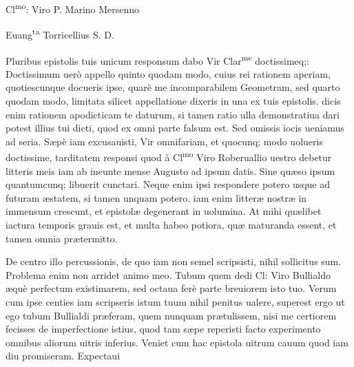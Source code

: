 \documentclass[11pt,a4paper]{article}
\begin{document}

Cl\textsuperscript{mo}: Viro P. Marino Mersenno

Euang\textsuperscript{ta} Torricellius S. D.

Pluribus epistolis tuis unicum responsum dabo Vir Clar\textsuperscript{me} doctissimeq;: Doctissimum uerò appello quinto quodam modo, cuius rei rationem aperiam, quotiescunque docueris ipse, quarè me incomparabilem Geometram, sed quarto quodam modo, limitata silicet appellatione dixeris in una ex tuis epistolis. dicis enim rationem apodicticam te daturum, si tamen ratio ulla demonstratiua dari potest illius tui dicti, quod ex omni parte falsum est. Sed omissis iocis ueniamus ad seria. Sæpè iam excusauisti, Vir omnifariam, et quocunq; modo uolueris doctissime, tarditatem responsi quod à Cl\textsuperscript{mo} Viro Roberuallio uestro debetur litteris meis iam ab ineunte mense Augusto ad ipsum datis. Sine quæso ipsum quantumcunq; libuerit cunctari. Neque enim ipsi respondere potero usque ad futuram æstatem, si tamen unquam potero. iam enim litteræ nostræ in immensum crescunt, et epistolæ degenerant in uolumina. At mihi quælibet iactura temporis grauis est, et multa habeo potiora, quæ maturanda essent, et tamen omnia prætermitto.

De centro illo percussionis, de quo iam non semel scripsisti, nihil sollicitus sum. Problema enim non arridet animo meo. Tubum quem dedi Cl: Viro Bullialdo æquè perfectum existimarem, sed octaua ferè parte breuiorem isto tuo. Verum cum ipse centies iam scripseris istum tuum nihil penitus ualere, superest ergo ut ego tubum Bullialdi præferam, quem nunquam prætulissem, nisi me certiorem fecisses de imperfectione istius, quod tam sæpe reperisti facto experimento omnibus aliorum uitris inferius. Veniet cum hac epistola uitrum cauum quod iam diu promiseram. Expectaui
\end{document}
